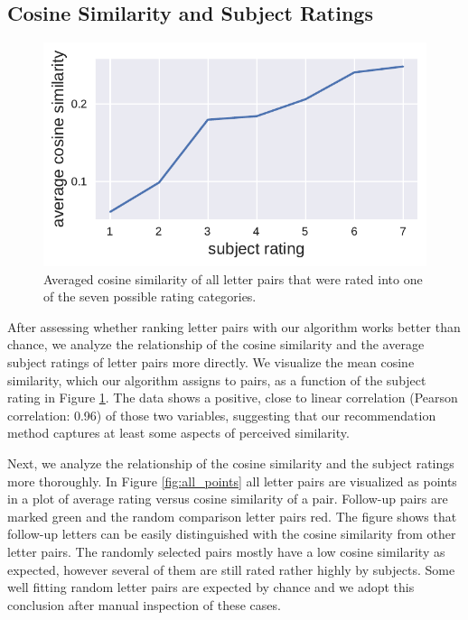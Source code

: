 \subsection*{Cosine Similarity and Subject Ratings}


\begin{figure}
	\begin{center}
		\includegraphics[width=0.98\linewidth]{figures/rating_vs_sim_mean}
	\end{center}
	\caption{Averaged cosine similarity of all letter pairs that were rated into one of the seven possible rating categories.}
	\label{fig:rating_vs_sim}
\end{figure} 
After assessing whether ranking letter pairs with our algorithm works better than chance, we analyze the relationship of the cosine similarity and the average subject ratings of letter pairs more directly. We visualize the mean cosine similarity, which our algorithm assigns to pairs, as a function of the subject rating in Figure \ref{fig:rating_vs_sim}. The data shows a positive, close to linear correlation (Pearson correlation: 0.96) of those two variables, suggesting that our recommendation method captures at least some aspects of perceived similarity.

%	
%		
Next, we analyze the relationship of the cosine similarity and the subject ratings more thoroughly. In Figure \ref{fig:all_points} all letter pairs are visualized as points in a plot of average rating versus cosine similarity of a pair. Follow-up pairs are marked green and the random comparison letter pairs red. The figure shows that follow-up letters can be easily distinguished with the cosine similarity from other letter pairs. The randomly selected pairs mostly have a low cosine similarity as expected, however several of them are still rated rather highly by subjects. Some well fitting random letter pairs are expected by chance and we adopt this conclusion after manual inspection of these cases.

